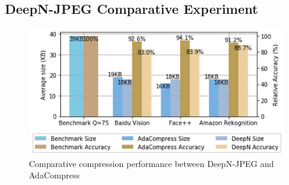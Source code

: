 \subsection{DeepN-JPEG Comparative Experiment}

\begin{figure}[htbp]
    \includegraphics[width=\linewidth]{figures/compare_DeepN.pdf}
    \caption{Comparative compression performance between DeepN-JPEG and AdaCompress}
    \label{fig: compare_DeepN}
\end{figure}

